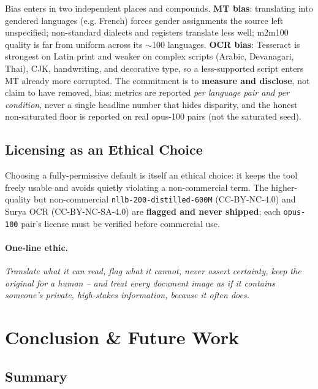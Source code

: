 \documentclass[12pt,a4paper]{article}
\begin{document}
Bias enters in two independent places and compounds. \textbf{MT bias}: translating into gendered languages (e.g. French) forces gender assignments the source left unspecified; non-standard dialects and registers translate less well; m2m100 quality is far from uniform across its $\sim$100 languages. \textbf{OCR bias}: Tesseract is strongest on Latin print and weaker on complex scripts (Arabic, Devanagari, Thai), CJK, handwriting, and decorative type, so a less-supported script enters MT already more corrupted. The commitment is to \textbf{measure and disclose}, not claim to have removed, bias: metrics are reported \emph{per language pair and per condition}, never a single headline number that hides disparity, and the honest non-saturated floor is reported on real opus-100 pairs (not the saturated seed).

\subsection{Licensing as an Ethical Choice}

Choosing a fully-permissive default is itself an ethical choice: it keeps the tool freely usable and avoids quietly violating a non-commercial term. The higher-quality but non-commercial \texttt{nllb-200-distilled-600M} (CC-BY-NC-4.0) and Surya OCR (CC-BY-NC-SA-4.0) are \textbf{flagged and never shipped}; each \texttt{opus-100} pair's license must be verified before commercial use.

\paragraph{One-line ethic.} \emph{Translate what it can read, flag what it cannot, never assert certainty, keep the original for a human -- and treat every document image as if it contains someone's private, high-stakes information, because it often does.}

\section{Conclusion \& Future Work}

\subsection{Summary}
\end{document}
